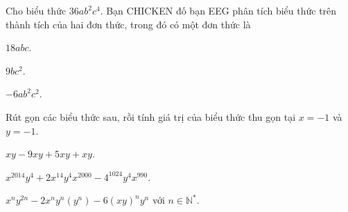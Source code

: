 \begin{bt}%
	Cho biểu thức $36ab^2c^4$. Bạn CHICKEN đố bạn EEG phân tích biểu thức trên thành tích của hai đơn thức, trong đó có một đơn thức là
	\begin{enumEX}{3}
		\item $18abc$.
		\item $9bc^2$.
		\item $-6ab^2c^2$.
		
	\end{enumEX}
\end{bt}

\begin{bt}%
	Rút gọn các biểu thức sau, rồi tính giá trị của biểu thức thu gọn tại $x=-1$ và $y=-1$.
	\begin{enumEX}{2}
		\item $xy-9xy+5xy+xy$.
		\item $x^{2014}y^4+2x^{14}y^4x^{2000}-4^{1024}y^4x^{990}$.
		\item $x^ny^{2n}-2x^ny^n(y^n)-6(xy)^ny^n$ với $n\in \mathbb{N^{*}}$.
	\end{enumEX}
\end{bt}

